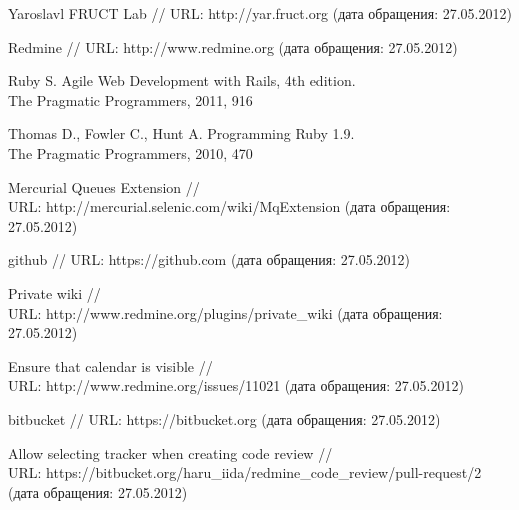 \begin{thebibliography}{99}

Yaroslavl FRUCT Lab  // URL:
http://yar.fruct.org (дата обращения: 27.05.2012)

Redmine  // URL:
http://www.redmine.org (дата обращения: 27.05.2012)

Ruby S. Agile Web Development with Rails, 4th edition. \\ The Pragmatic
Programmers, 2011, 916

Thomas D., Fowler C., Hunt A. Programming Ruby 1.9. \\ The Pragmatic
Programmers, 2010, 470

Mercurial Queues Extension // \\ URL:
http://mercurial.selenic.com/wiki/MqExtension (дата обращения: 27.05.2012)

github // URL: https://github.com (дата обращения: 27.05.2012)

Private wiki // \\ URL:
http://www.redmine.org/plugins/private\_wiki (дата обращения: 27.05.2012)

Ensure that calendar is visible // \\ URL:
http://www.redmine.org/issues/11021 (дата обращения: 27.05.2012)

bitbucket // URL: 
https://bitbucket.org (дата обращения: 27.05.2012)

Allow selecting tracker when creating code review // \\ URL: 
https://bitbucket.org/haru\_iida/redmine\_code\_review/pull-request/2 \\
(дата обращения: 27.05.2012)

\end{thebibliography}
